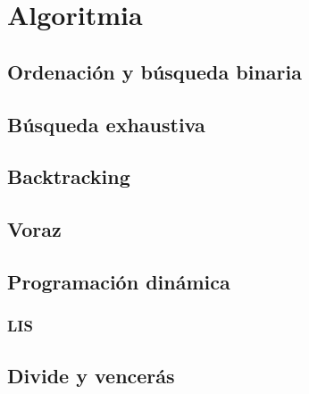 \chapter{Algoritmia}

\section{Ordenación y búsqueda binaria}

\section{Búsqueda exhaustiva}

\section{Backtracking}

\section{Voraz}

\section{Programación dinámica}
\subsection{LIS}

\section{Divide y vencerás}
